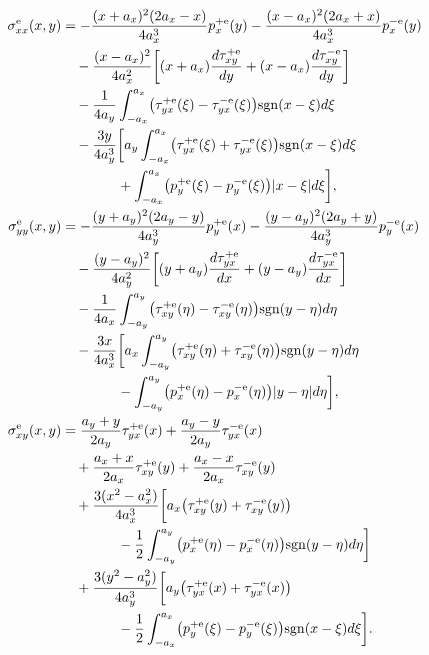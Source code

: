 \begin{align}
	\sigma_{xx}^{\mathrm e}(x,y)
	&= -\frac{(x+a_x)^2(2a_x-x)}{4a_x^3} p_x^{+\mathrm e}(y)
	-\frac{(x-a_x)^2(2a_x+x)}{4a_x^3} p_x^{-\mathrm e}(y) \notag\\
	&\quad -\frac{(x-a_x)^2}{4a_x^2}\biggl[
	(x+a_x)\frac{d\tau_{xy}^{+\mathrm e}}{dy}
	+(x-a_x)\frac{d\tau_{xy}^{-\mathrm e}}{dy}
	\biggr] \notag\\
	&\quad -\frac{1}{4a_y}
	\int_{-a_x}^{a_x} 
	\bigl(\tau_{yx}^{+\mathrm e}(\xi)-\tau_{yx}^{-\mathrm e}(\xi)\bigr)
	 \mathrm{sgn}(x-\xi) d\xi 
	\notag\\
	&\quad -\frac{3y}{4a_y^3}\biggl[
	a_y \int_{-a_x}^{a_x} 
	\bigl(\tau_{yx}^{+\mathrm e}(\xi)+\tau_{yx}^{-\mathrm e}(\xi)\bigr)
	\mathrm{sgn}(x-\xi) d\xi 
	\notag\\
	&\qquad\qquad
	+ \int_{-a_x}^{a_x} 
	\bigl(p_y^{+\mathrm e}(\xi)-p_y^{-\mathrm e}(\xi)\bigr)
	|x-\xi| d\xi
	\biggr], 
	\label{YuzvyakEq43}\\
	\sigma_{yy}^{\mathrm e}(x,y)
	&= -\frac{(y+a_y)^2(2a_y-y)}{4a_y^3} p_y^{+\mathrm e}(x)
	-\frac{(y-a_y)^2(2a_y+y)}{4a_y^3} p_y^{-\mathrm e}(x) \notag\\
	&\quad -\frac{(y-a_y)^2}{4a_y^2}\biggl[
	(y+a_y)\frac{d\tau_{yx}^{+\mathrm e}}{dx}
	+(y-a_y)\frac{d\tau_{yx}^{-\mathrm e}}{dx}
	\biggr] \notag\\
	&\quad -\frac{1}{4a_x}
	\int_{-a_y}^{a_y} 
	\bigl(\tau_{xy}^{+\mathrm e}(\eta)-\tau_{xy}^{-\mathrm e}(\eta)\bigr)
	 \mathrm{sgn}(y-\eta) d\eta \notag\\
	&\quad -\frac{3x}{4a_x^3}\biggl[
	a_x \int_{-a_y}^{a_y} 
	\bigl(\tau_{xy}^{+\mathrm e}(\eta)+\tau_{xy}^{-\mathrm e}(\eta)\bigr)
	\mathrm{sgn}(y-\eta) d\eta \notag\\
	&\qquad\qquad
	- \int_{-a_y}^{a_y} 
	\bigl(p_x^{+\mathrm e}(\eta)-p_x^{-\mathrm e}(\eta)\bigr)
	|y-\eta| d\eta
	\biggr], 
	\label{YuzvyakEq44}\\
	\sigma_{xy}^{\mathrm e}(x,y)
	&= \frac{a_y+y}{2a_y} \tau_{yx}^{+\mathrm e}(x)
	+\frac{a_y-y}{2a_y} \tau_{yx}^{-\mathrm e}(x)
	\notag\\
	&\quad+\frac{a_x+x}{2a_x} \tau_{xy}^{+\mathrm e}(y)
	+\frac{a_x-x}{2a_x} \tau_{xy}^{-\mathrm e}(y) 
	\notag\\
	&\quad +\frac{3(x^2-a_x^2)}{4a_x^3}\biggl[
	a_x\bigl(\tau_{xy}^{+\mathrm e}(y)+\tau_{xy}^{-\mathrm e}(y)\bigr)
	\notag\\
	&\qquad\qquad-\frac12\int_{-a_y}^{a_y} 
	\bigl(p_x^{+\mathrm e}(\eta)-p_x^{-\mathrm e}(\eta)\bigr)
	\mathrm{sgn}(y-\eta) d\eta
	\biggr] 
	\notag\\
	&\quad +\frac{3(y^2-a_y^2)}{4a_y^3}\biggl[
	a_y\bigl(\tau_{yx}^{+\mathrm e}(x)+\tau_{yx}^{-\mathrm e}(x)\bigr)
	\notag\\
	&\qquad\qquad-\frac12\int_{-a_x}^{a_x} 
	\bigl(p_y^{+\mathrm e}(\xi)-p_y^{-\mathrm e}(\xi)\bigr)
	\mathrm{sgn}(x-\xi) d\xi
	\biggr].
	\label{YuzvyakEq45}
\end{align}

